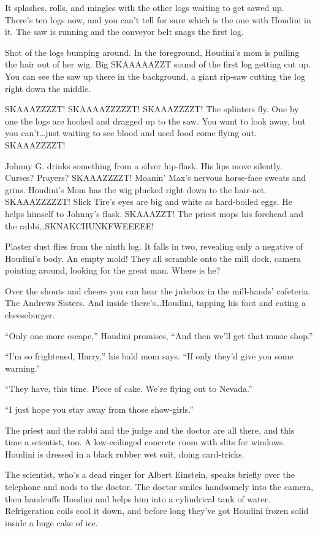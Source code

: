 It splashes, rolls, and mingles with the other logs waiting to get sawed up. There’s ten logs now, and you can’t tell for sure which is the one with Houdini in it. The saw is running and the conveyor belt snags the first log.

Shot of the logs bumping around. In the foreground, Houdini’s mom is pulling the hair out of her wig. Big SKAAAAAZZT sound of the first log getting cut up. You can see the saw up there in the background, a giant rip-saw cutting the log right down the middle.

SKAAAZZZZT! SKAAAAZZZZZT! SKAAAZZZZT! The splinters fly. One by one the logs are hooked and dragged up to the saw. You want to look away, but you can’t…just waiting to see blood and used food come flying out. SKAAAZZZZT!

Johnny G. drinks something from a silver hip-flask. His lips move silently. Curses? Prayers? SKAAAZZZZT! Moanin’ Max’s nervous horse-face sweats and grins. Houdini’s Mom has the wig plucked right down to the hair-net. SKAAAZZZZZT! Slick Tire’s eyes are big and white as hard-boiled eggs. He helps himself to Johnny’s flask. SKAAAZZT! The priest mops his forehead and the rabbi…SKNAKCHUNKFWEEEEE!

Plaster dust flies from the ninth log. It falls in two, revealing only a negative of Houdini’s body. An empty mold! They all scramble onto the mill dock, camera pointing around, looking for the great man. Where is he?

Over the shouts and cheers you can hear the jukebox in the mill-hands’ cafeteria. The Andrews Sisters. And inside there’s…Houdini, tapping his foot and eating a cheeseburger.

“Only one more escape,” Houdini promises, “And then we’ll get that music shop.”

“I’m so frightened, Harry,” his bald mom says. “If only they’d give you some warning.”

“They have, this time. Piece of cake. We’re flying out to Nevada.”

“I just hope you stay away from those show-girls.”

The priest and the rabbi and the judge and the doctor are all there, and this time a scientist, too. A low-ceilinged concrete room with slits for windows. Houdini is dressed in a black rubber wet suit, doing card-tricks.

The scientist, who’s a dead ringer for Albert Einstein, speaks briefly over the telephone and nods to the doctor. The doctor smiles handsomely into the camera, then handcuffs Houdini and helps him into a cylindrical tank of water. Refrigeration coils cool it down, and before long they’ve got Houdini frozen solid inside a huge cake of ice.

